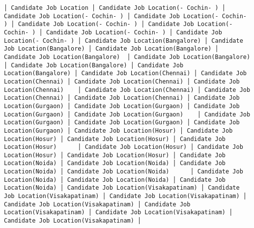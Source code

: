 \documentclass[11pt]{article}
\begin{document}
\begin{Verbatim}[commandchars=\\\{\}]
│ Candidate Job Location │ Candidate Job Location(- Cochin- ) │ Candidate Job Location(- Cochin- ) │ Candidate Job Location(- Cochin- ) │ Candidate Job Location(- Cochin- ) │ Candidate Job Location(- Cochin- ) │ Candidate Job Location(- Cochin- ) │ Candidate Job Location(- Cochin- ) │ Candidate Job Location(Bangalore) │ Candidate Job Location(Bangalore) │ Candidate Job Location(Bangalore) │ Candidate Job Location(Bangalore)  │ Candidate Job Location(Bangalore) │ Candidate Job Location(Bangalore) │ Candidate Job Location(Bangalore) │ Candidate Job Location(Chennai) │ Candidate Job Location(Chennai) │ Candidate Job Location(Chennai) │ Candidate Job Location(Chennai)    │ Candidate Job Location(Chennai) │ Candidate Job Location(Chennai) │ Candidate Job Location(Chennai) │ Candidate Job Location(Gurgaon) │ Candidate Job Location(Gurgaon) │ Candidate Job Location(Gurgaon) │ Candidate Job Location(Gurgaon)    │ Candidate Job Location(Gurgaon) │ Candidate Job Location(Gurgaon) │ Candidate Job Location(Gurgaon) │ Candidate Job Location(Hosur) │ Candidate Job Location(Hosur) │ Candidate Job Location(Hosur) │ Candidate Job Location(Hosur)      │ Candidate Job Location(Hosur) │ Candidate Job Location(Hosur) │ Candidate Job Location(Hosur) │ Candidate Job Location(Noida) │ Candidate Job Location(Noida) │ Candidate Job Location(Noida) │ Candidate Job Location(Noida)      │ Candidate Job Location(Noida) │ Candidate Job Location(Noida) │ Candidate Job Location(Noida) │ Candidate Job Location(Visakapatinam) │ Candidate Job Location(Visakapatinam) │ Candidate Job Location(Visakapatinam) │ Candidate Job Location(Visakapatinam) │ Candidate Job Location(Visakapatinam) │ Candidate Job Location(Visakapatinam) │ Candidate Job Location(Visakapatinam) │

\end{Verbatim}
\end{document}
